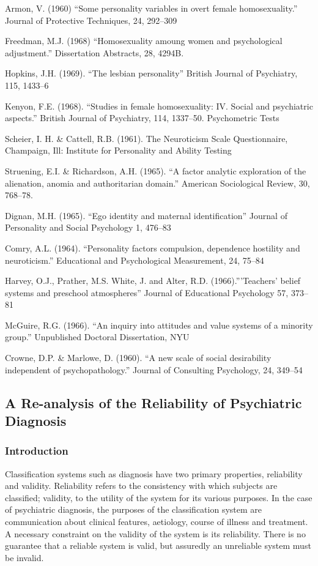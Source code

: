 \begin{refsection}
Armon, V. (1960) “Some personality variables in overt female homosexuality.” Journal of Protective Techniques, 24, 292--309

Freedman, M.J. (1968) “Homosexuality amoung women and psychological adjustment.” Dissertation Abstracts, 28, 4294B.

Hopkins, J.H. (1969). “The lesbian personality” British Journal of Psychiatry, 115, 1433--6

Kenyon, F.E. (1968). “Studies in female homosexuality: IV. Social and psychiatric aspects.” British Journal of Psychiatry, 114, 1337--50.
Psychometric Tests

Scheier, I. H. \& Cattell, R.B. (1961). The Neuroticism Scale Questionnaire, Champaign, Ill: Institute for Personality and Ability Testing

Struening, E.I. \& Richardson, A.H. (1965). “A factor analytic exploration of the alienation, anomia and authoritarian domain.” American Sociological Review, 30, 768--78.

Dignan, M.H. (1965). “Ego identity and maternal identification” Journal of Personality and Social Psychology 1, 476--83

Comry, A.L. (1964). “Personality factors compulsion, dependence hostility and neuroticism.” Educational and Psychological Measurement, 24, 75--84

Harvey, O.J., Prather, M.S. White, J. and Alter, R.D. (1966).”'Teachers' belief systems and preschool atmospheres” Journal of Educational Psychology 57, 373--81

McGuire, R.G. (1966). “An inquiry into attitudes and value systems of a minority group.” Unpublished Doctoral Dissertation, NYU

Crowne, D.P. \& Marlowe, D. (1960). “A new scale of social desirability independent of psychopathology.” Journal of Consulting Psychology, 24, 349--54

\newpage

\subsection{A Re-analysis of the Reliability of Psychiatric Diagnosis}
\label{are-analysisofthereliabilityofpsychiatricdiagnosis}

\subsubsection{Introduction}
\label{introduction}

Classification systems such as diagnosis have two primary properties, reliability and validity. Reliability refers to the consistency with which subjects are classified; validity, to the utility of the system for its various purposes. In the case of psychiatric diagnosis, the purposes of the classification system are communication about clinical features, aetiology, course of illness and treatment. A necessary constraint on the validity of the system is its reliability. There is no guarantee that a reliable system is valid, but assuredly an unreliable system must be invalid.


\end{refsection}
